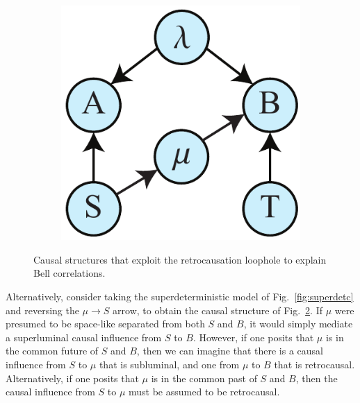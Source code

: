 \documentclass[12pt,onecolumn,nofootinbib]{revtex4-2}
\begin{document}
\begin{figure}[h]
\begin{subfigure}[b]{0.18\textwidth}
             	\subcaption{}
                	\label{fig:retrob}
        \end{subfigure}
        \hspace{5em}
        \begin{subfigure}[b]{0.18\textwidth}
                	\centering
        		\includegraphics[width=\textwidth]{bell-SB-ret-1}
             	\subcaption{}
                	\label{fig:retroc}
        \end{subfigure}
 \caption{Causal structures that exploit the retrocausation loophole to explain Bell correlations.}
 \label{fig:retro}
\end{figure}


Alternatively, consider taking the superdeterministic model of Fig.~\ref{fig:superdetc} and reversing the $\mu \to S$ arrow, to obtain the causal structure of Fig.~\ref{fig:retroc}.  If $\mu$ were presumed to be space-like separated from both $S$ and $B$, it would simply mediate a superluminal causal influence from $S$ to $B$.  However, if one posits that $\mu$ is in the common future of $S$ and $B$, then we can imagine that there is a causal influence from $S$ to $\mu$ that is subluminal, and one from $\mu$ to $B$ that is retrocausal.  Alternatively, if one posits that $\mu$ is in the common past of $S$ and $B$, then the causal influence from $S$ to $\mu$ must be assumed to be retrocausal.
\end{document}
